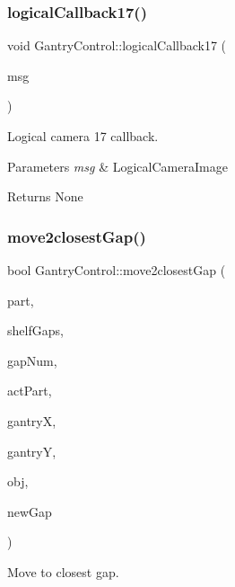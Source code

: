 \subsubsection{\texorpdfstring{logical\+Callback17()}{logicalCallback17()}}
{\footnotesize\ttfamily void Gantry\+Control\+::logical\+Callback17 (\begin{DoxyParamCaption}\item[{const nist\+\_\+gear\+::\+Logical\+Camera\+Image \&}]{msg }\end{DoxyParamCaption})}



Logical camera 17 callback. 


\begin{DoxyParams}{Parameters}
{\em msg} & Logical\+Camera\+Image \\
\hline
\end{DoxyParams}
\begin{DoxyReturn}{Returns}
None 
\end{DoxyReturn}
\mbox{\label{classGantryControl_aa6ba7baf102ac7e39d68b2ae2492f9a5}} 
\subsubsection{\texorpdfstring{move2closest\+Gap()}{move2closestGap()}}
{\footnotesize\ttfamily bool Gantry\+Control\+::move2closest\+Gap (\begin{DoxyParamCaption}\item[{struct \hyperlink{structPart}{Part} \&}]{part,  }\item[{std\+::vector$<$ std\+::pair$<$ float, float $>$ $>$ \&}]{shelf\+Gaps,  }\item[{const std\+::vector$<$ int $>$ \&}]{gap\+Num,  }\item[{bool}]{act\+Part,  }\item[{float \&}]{gantryX,  }\item[{float \&}]{gantryY,  }\item[{\hyperlink{classObstaclesInAisle}{Obstacles\+In\+Aisle} \&}]{obj,  }\item[{int \&}]{new\+Gap }\end{DoxyParamCaption})}



Move to closest gap. 


